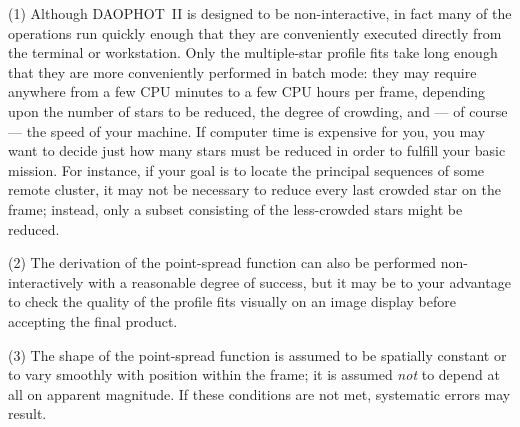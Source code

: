 \item{(1)} Although DAOPHOT~II is designed to be non-interactive, in
fact many of the operations run quickly enough that they are
conveniently executed directly from the terminal or workstation.  Only
the multiple-star profile fits take long enough that they are more
conveniently performed in batch mode: they may require anywhere from a
few CPU minutes to a few CPU hours per frame, depending upon the number
of stars to be reduced, the degree of crowding, and --- of course ---
the speed of your machine.  If computer time is expensive for you, you
may want to decide just how many stars must be reduced in order to
fulfill your basic mission.  For instance, if your goal is to locate
the principal sequences of some remote cluster, it may not be necessary
to reduce every last crowded star on the frame; instead, only a subset
consisting of the less-crowded stars might be reduced.

\item{(2)} The derivation of the point-spread function can also be
performed non-interactively with a reasonable degree of success,
but it may be to your advantage to check the quality of the profile
fits visually on an image display before accepting the final product.

\item{(3)} The shape of the point-spread function is assumed to
be spatially constant or to vary smoothly with position within the
frame; it is assumed {\it not\/} to depend at all on apparent
magnitude.  If these conditions are not met, systematic errors may
result.

